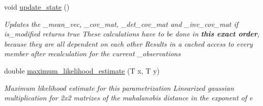 \begin{DoxyCompactItemize}
void \hyperlink{classclara_1_1cone__state_a8cb6454f6a731f69d3e85382b0ae40b4}{update\+\_\+state} ()
\begin{DoxyCompactList}\small\item\em Updates the {\ttfamily \+\_\+mean\+\_\+vec}, {\ttfamily \+\_\+cov\+\_\+mat}, {\ttfamily \+\_\+det\+\_\+cov\+\_\+mat} and {\ttfamily \+\_\+inv\+\_\+cov\+\_\+mat} if {\ttfamily is\+\_\+modified} returns true These calculations have to be done in {\bfseries this exact order}, because they are all dependent on each other Results in a cached access to every member after recalculation for the current {\ttfamily \+\_\+observations} \end{DoxyCompactList}\item 
double \hyperlink{classclara_1_1cone__state_a331360538f2fc8ccaaa37db2a71cc1a8}{maximum\+\_\+likelihood\+\_\+estimate} (T x, T y)
\begin{DoxyCompactList}\small\item\em Maximum likelihood estimate for this parametrization Linearized gaussian multiplication for 2x2 matrizes of the mahalanobis distance in the exponent of {\ttfamily e} \end{DoxyCompactList}\end{DoxyCompactItemize}
